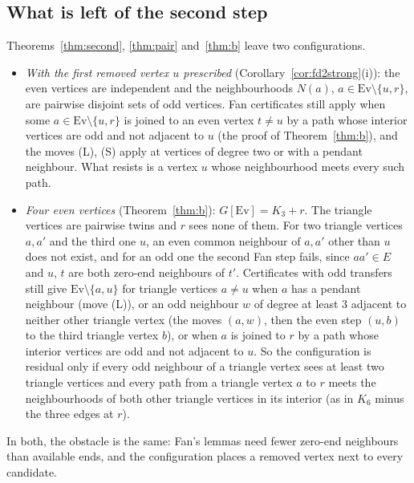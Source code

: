 \documentclass[11pt]{amsart}
\theoremstyle{definition}
\newcommand{\Ev}{\mathrm{Ev}}
\begin{document}
\subsection{What is left of the second step}

Theorems~\ref{thm:second}, \ref{thm:pair} and~\ref{thm:b} leave two configurations.
\begin{itemize}
\item \emph{With the first removed vertex $u$ prescribed} (Corollary~\ref{cor:fd2strong}(i)): the
even vertices are independent and the neighbourhoods $N(a)$, $a\in\Ev\setminus\{u,r\}$, are pairwise
disjoint sets of odd vertices. Fan certificates still apply when some $a\in\Ev\setminus\{u,r\}$ is
joined to an even vertex $t\ne u$ by a path whose interior vertices are odd and not adjacent to
$u$ (the proof of Theorem~\ref{thm:b}), and the moves (L), (S) apply at vertices of degree two or
with a pendant neighbour. What resists is a vertex $u$ whose neighbourhood meets every such path.
\item \emph{Four even vertices} (Theorem~\ref{thm:b}): $G[\Ev]=K_3+r$. The triangle vertices are
pairwise twins and $r$ sees none of them. For two triangle vertices $a,a'$ and the third one $u$,
an even common neighbour of $a,a'$ other than $u$ does not exist, and for an odd one the second Fan
step fails, since $aa'\in E$ and $u$, $t$ are both zero-end neighbours of $t'$. Certificates with
odd transfers still give $\Ev\setminus\{a,u\}$ for triangle vertices $a\ne u$ when $a$ has a
pendant neighbour (move (L)), or an odd neighbour $w$ of degree at least $3$ adjacent to neither
other triangle vertex (the moves $(a,w)$, then the even step $(u,b)$ to the third triangle vertex
$b$), or when $a$ is joined to $r$ by a path whose interior vertices are odd and not adjacent to
$u$. So the configuration is residual only if every odd neighbour of a triangle vertex sees at
least two triangle vertices and every path from a triangle vertex $a$ to $r$ meets the neighbourhoods of
both other triangle vertices in its interior (as in $K_6$ minus the three edges at $r$).
\end{itemize}
In both, the obstacle is the same: Fan's lemmas need fewer zero-end neighbours than available ends,
and the configuration places a removed vertex next to every candidate.
\end{document}
